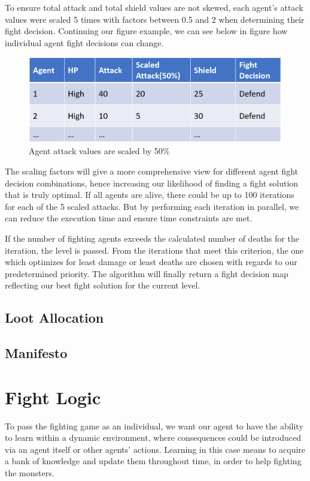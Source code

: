 To ensure total attack and total shield values are not skewed, each agent's attack values were scaled 5 times with factors between 0.5 and 2 when determining their fight decision. Continuing our figure example, we can see below in figure how individual agent fight decisions can change.
\begin{figure}[htb]
    \centering
    \includegraphics[width=1\textwidth]{008_team_5_agent_design/images/scaled-attack.PNG}
    \caption{Agent attack values are scaled by 50\%}
    \label{scaledattack}
\end{figure}

The scaling factors will give a more comprehensive view for different agent fight decision combinations, hence increasing our likelihood of finding a fight solution that is truly optimal. If all agents are alive, there could be up to 100 iterations for each of the 5 scaled attacks. But by performing each iteration in parallel, we can reduce the execution time and ensure time constraints are met.

If the number of fighting agents exceeds the calculated number of deaths for the iteration, the level is passed. From the iterations that meet this criterion, the one which optimizes for least damage or least deaths are chosen with regards to our predetermined priority. The algorithm will finally return a fight decision map reflecting our best fight solution for the current level.



\subsection{Loot Allocation}
\subsection{Manifesto}



\section{Fight Logic}
To pass the fighting game as an individual, we want our agent to have the ability to learn within a dynamic environment, where consequences could be introduced via an agent itself or other agents' actions. Learning in this case means to acquire a bank of knowledge and update them throughout time, in order to help fighting the monsters.

